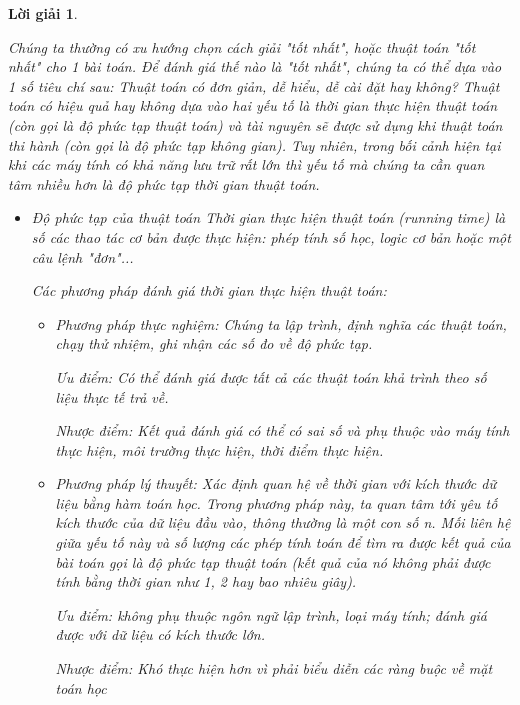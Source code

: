 \documentclass[14pt, a4paper]{article}
\theoremstyle{sltheorem}
\theoremstyle{soltheorem}
\newtheorem*{loigiai}{Lời giải}
\begin{document}
\begin{loigiai}
\begin{enumerate}[a)]
\begin{itemize}
                Chúng ta thường có xu hướng chọn cách giải "tốt nhất", hoặc thuật toán "tốt nhất" cho 1 bài toán. 
                Để đánh giá thế nào là "tốt nhất", chúng ta có thể dựa vào 1 số tiêu chí sau: Thuật toán có đơn giản, dễ hiểu, dễ cài đặt hay không? 
                Thuật toán có hiệu quả hay không dựa vào hai yếu tố là thời gian thực hiện thuật toán (còn gọi là độ phức tạp thuật toán) và tài nguyên sẽ được sử dụng khi thuật toán thi hành (còn gọi là độ phức tạp không gian). 
                Tuy nhiên, trong bối cảnh hiện tại khi các máy tính có khả năng lưu trữ rất lớn thì yếu tố mà chúng ta cần quan tâm nhiều hơn là độ phức tạp thời gian thuật toán.
                \begin{itemize}
                    \item Độ phức tạp của thuật toán
                    Thời gian thực hiện thuật toán (running time) là số các thao tác cơ bản được thực hiện: phép tính số học, logic cơ bản hoặc một câu lệnh "đơn"...
                    
                    Các phương pháp đánh giá thời gian thực hiện thuật toán:
                    \begin{itemize}
                        \item Phương pháp thực nghiệm: Chúng ta lập trình, định nghĩa các thuật toán, chạy thử nhiệm, ghi nhận các số đo về độ phức tạp.
                        
                        Ưu điểm: Có thể đánh giá được tất cả các thuật toán khả trình theo số liệu thực tế trả về.

                        Nhược điểm: Kết quả đánh giá có thể có sai số và phụ thuộc vào máy tính thực hiện, môi trường thực hiện, thời điểm thực hiện.

                        \item Phương pháp lý thuyết: Xác định quan hệ về thời gian với kích thước dữ liệu bằng hàm toán học. Trong phương pháp này, ta quan tâm tới yêu tố kích thước của dữ liệu đầu vào, thông thường là một con số n. Mối liên hệ giữa yếu tố này và số lượng các phép tính toán để tìm ra được kết quả của bài toán gọi là độ phức tạp thuật toán (kết quả của nó không phải được tính bằng thời gian như 1, 2 hay bao nhiêu giây).
                        
                        Ưu điểm: không phụ thuộc ngôn ngữ lập trình, loại máy tính; đánh giá được với dữ liệu có kích thước lớn.

                        Nhược điểm: Khó thực hiện hơn vì phải biểu diễn các ràng buộc về mặt toán học


\end{itemize}
\end{itemize}
\end{itemize}
\end{enumerate}
\end{loigiai}
\end{document}
